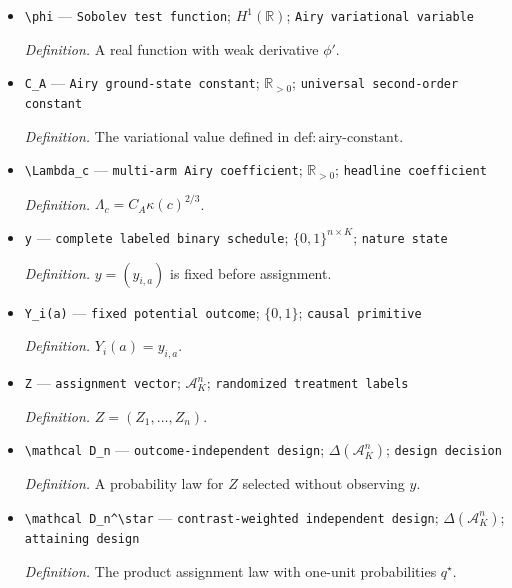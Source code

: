 \documentclass{article}
\begin{document}
\begin{itemize}
  \par\smallskip\noindent\emph{Definition.} \(\kappa(c)=V_c(v)\).
  \item \texttt{\textbackslash{}\allowbreak{}phi} --- \texttt{Sobolev test function}; \(H^1(\mathbb R)\); \texttt{Airy variational variable}
  \par\smallskip\noindent\emph{Definition.} A real function with weak derivative \(\phi'\).
  \item \texttt{C\_\allowbreak{}A} --- \texttt{Airy ground-\allowbreak{}state constant}; \(\mathbb R_{>0}\); \texttt{universal second-\allowbreak{}order constant}
  \par\smallskip\noindent\emph{Definition.} The variational value defined in \(\mathrm{def:airy\text{-}constant}\).
  \item \texttt{\textbackslash{}\allowbreak{}Lambda\_\allowbreak{}c} --- \texttt{multi-\allowbreak{}arm Airy coefficient}; \(\mathbb R_{>0}\); \texttt{headline coefficient}
  \par\smallskip\noindent\emph{Definition.} \(\Lambda_c=C_A\kappa(c)^{2/3}\).
  \item \texttt{y} --- \texttt{complete labeled binary schedule}; \(\{0,1\}^{n\times K}\); \texttt{nature state}
  \par\smallskip\noindent\emph{Definition.} \(y=(y_{i,a})\) is fixed before assignment.
  \item \texttt{Y\_\allowbreak{}i(a)} --- \texttt{fixed potential outcome}; \(\{0,1\}\); \texttt{causal primitive}
  \par\smallskip\noindent\emph{Definition.} \(Y_i(a)=y_{i,a}\).
  \item \texttt{Z} --- \texttt{assignment vector}; \(\mathcal A_K^n\); \texttt{randomized treatment labels}
  \par\smallskip\noindent\emph{Definition.} \(Z=(Z_1,\ldots,Z_n)\).
  \item \texttt{\textbackslash{}\allowbreak{}mathcal D\_\allowbreak{}n} --- \texttt{outcome-\allowbreak{}independent design}; \(\Delta(\mathcal A_K^n)\); \texttt{design decision}
  \par\smallskip\noindent\emph{Definition.} A probability law for \(Z\) selected without observing \(y\).
  \item \texttt{\textbackslash{}\allowbreak{}mathcal D\_\allowbreak{}n\textasciicircum{}\textbackslash{}\allowbreak{}star} --- \texttt{contrast-\allowbreak{}weighted independent design}; \(\Delta(\mathcal A_K^n)\); \texttt{attaining design}
  \par\smallskip\noindent\emph{Definition.} The product assignment law with one-unit probabilities \(q^\star\).

\end{itemize}
\end{document}
